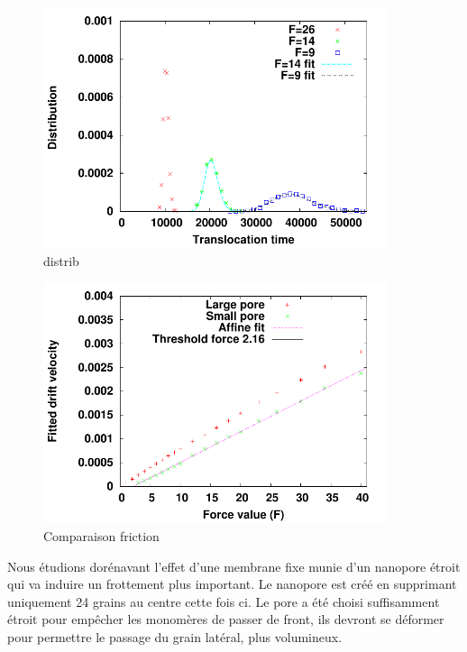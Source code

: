 \documentclass[a4paper,11pt]{article}
\begin{document}
\begin{figure}[H]
\begin{center}
\includegraphics[width=0.9\textwidth]{distribsmallpore.pdf} 
\caption{distrib}
\label{smallporedistrib}
\end{center}
\end{figure}




\begin{figure}[H]
\begin{center}
\includegraphics[width=0.9\textwidth]{structuredporesfirction.pdf} 
\caption{Comparaison friction}
\label{compporesizefriction}
\end{center}
\end{figure}




Nous étudions dorénavant l'effet d'une membrane fixe munie d'un nanopore étroit qui va induire un frottement plus important. Le nanopore est créé en supprimant uniquement 24 grains au centre cette fois ci. Le pore a été choisi suffisamment étroit pour empêcher les monomères de passer de front, ils devront se déformer pour permettre le passage du grain latéral, plus volumineux.\\
\end{document}
